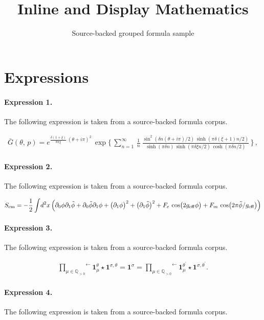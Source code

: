 \documentclass[11pt]{article}
\title{Inline and Display Mathematics}
\author{Source-backed grouped formula sample}
\date{}
\begin{document}
\maketitle
\section{Expressions}
\paragraph{Expression 1.} The following expression is taken from a source-backed formula corpus.

\begin{align*} \bar{G}(\theta ,\, p) = e^{\frac{\delta(1+\xi)}{8\pi\xi}\, (\theta+i\pi)^2}\, \exp\bigg\{\, \sum_{n=1}^{\infty}\, \frac{1}{n}\ \frac{\sin^2(\delta n (\theta+i\pi)/2)\, \sinh(\pi\delta(\xi+1) n/2)} {\sinh(\pi\delta n)\, \sinh(\pi\delta\xi n/2)\, \cosh(\pi \delta n/2) }\, \bigg\}\, ,\end{align*}

\paragraph{Expression 2.} The following expression is taken from a source-backed formula corpus.

\begin{align*}S_{\rm em} = -{1\over 2}\int\! d^2x\,\Bigl( \partial_0\phi\partial_1\tilde\phi +\partial_0\tilde\phi\partial_1\phi +\bigl( \partial_1\phi\bigr)^2 + \bigl( \partial_1\tilde\phi\bigr)^2+ F_e\, \cos \bigl( 2g_{\rm eff}\phi\bigr) + F_m\,\cos\bigl( 2\pi\tilde\phi /g_{\rm eff}\bigr)\Bigr)\end{align*}

\paragraph{Expression 3.} The following expression is taken from a source-backed formula corpus.

\begin{align*}\overset{\longleftarrow}{\prod_{\mu \in \mathbb{Q}_{> 0}}} \mathbf{1}_{\mu}^{\theta } \star \mathbf{1}^{\sigma, \theta }= \mathbf{1}^{\sigma} = \overset{\longleftarrow}{\prod_{\mu \in \mathbb{Q}_{> 0}}} \mathbf{1}_{\mu}^{\theta^{\prime} } \star \mathbf{1}^{\sigma, \theta^{\prime} }.\end{align*}

\paragraph{Expression 4.} The following expression is taken from a source-backed formula corpus.
\end{document}
